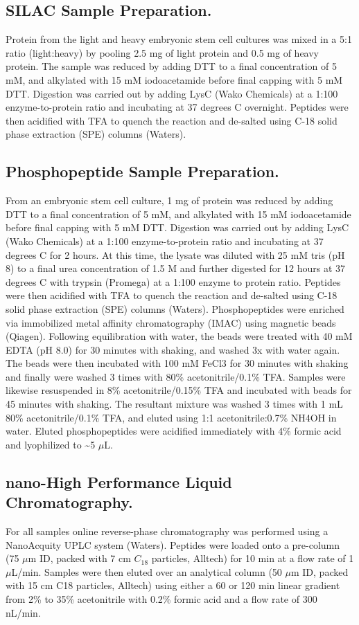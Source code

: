 \subsection{SILAC Sample Preparation.}
Protein from the light and heavy embryonic stem cell cultures was mixed in a 5:1 ratio (light:heavy) by pooling 2.5 mg of light protein and 0.5 mg of heavy protein. The sample was reduced by adding DTT to a final concentration of 5 mM, and alkylated with 15 mM iodoacetamide before final capping with 5 mM DTT. Digestion was carried out by adding LysC (Wako Chemicals) at a 1:100 enzyme-to-protein ratio and incubating at 37 degrees C overnight. Peptides were then acidified with TFA to quench the reaction and de-salted using C-18 solid phase extraction (SPE) columns (Waters).

\subsection{Phosphopeptide Sample Preparation.}
From an embryonic stem cell culture, 1 mg of protein was reduced by adding DTT to a final concentration of 5 mM, and alkylated with 15 mM iodoacetamide before final capping with 5 mM DTT. Digestion was carried out by adding LysC (Wako Chemicals) at a 1:100 enzyme-to-protein ratio and incubating at 37 degrees C for 2 hours. At this time, the lysate was diluted with 25 mM tris (pH 8) to a final urea concentration of 1.5 M and further digested for 12 hours at 37 degrees C with trypsin (Promega) at a 1:100 enzyme to protein ratio. Peptides were then acidified with TFA to quench the reaction and de-salted using C-18 solid phase extraction (SPE) columns (Waters).
Phosphopeptides were enriched via immobilized metal affinity chromatography (IMAC) using magnetic beads (Qiagen). Following equilibration with water, the beads were treated with 40 mM EDTA (pH 8.0) for 30 minutes with shaking, and washed 3x with water again. The beads were then incubated with 100 mM FeCl3 for 30 minutes with shaking and finally were washed 3 times with 80\% acetonitrile/0.1\% TFA. Samples were likewise resuspended in 8\% acetonitrile/0.15\% TFA and incubated with beads for 45 minutes with shaking. The resultant mixture was washed 3 times with 1 mL 80\% acetonitrile/0.1\% TFA, and eluted using 1:1 acetonitrile:0.7\% NH4OH in water. Eluted phosphopeptides were acidified immediately with 4\% formic acid and lyophilized to \textasciitilde5 $\mu$L.

\subsection{nano-High Performance Liquid Chromatography.}
For all samples online reverse-phase chromatography was performed using a NanoAcquity UPLC system (Waters). Peptides were loaded onto a pre-column (75 $\mu$m ID, packed with 7 cm $C_{18}$ particles, Alltech) for 10 min at a flow rate of 1 $\mu$L/min. Samples were then eluted over an analytical column (50 $\mu$m ID, packed with 15 cm C18 particles, Alltech) using either a 60 or 120 min linear gradient from 2\% to 35\% acetonitrile with 0.2\% formic acid and a flow rate of 300 nL/min.

